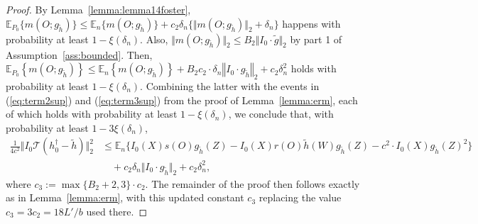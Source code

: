 \documentclass[twoside,11pt]{article}
\newcommand{\E}{\mathbb{E}}
\newcommand{\mc}{\mathcal}
\begin{document}
\begin{proof}
 By Lemma~\ref{lemma:lemma14foster}, $\E_{P_0}\{m(O;g_{\tilde h})\}\le \E_n\{m(O;g_{\tilde h})\}+ c_2\delta_n\{\Vert m(O;g_{\tilde h})\Vert_2+\delta_n\}$
happens with probability at least $1-\xi(\delta_n)$. Also, $\Vert m(O;g_{\tilde h})\Vert_2\le B_2\Vert I_0\cdot\tilde  g\Vert_2$ by part 1 of Assumption~\ref{ass:bounded}. Then, $\E_{P_0}\left\{m(O;g_{\tilde h})\right\}\le \E_n\left\{m(O;g_{\tilde h})\right\}+ B_2c_2\cdot\delta_n\left\Vert I_0\cdot g_{\tilde h}\right\Vert_2+c_2\delta^2_n$ holds with probability at least $1-\xi(\delta_n)$. Combining the latter with the events in (\ref{eq:term2sup}) and (\ref{eq:term3sup}) from the proof of Lemma~\ref{lemma:erm}, each of which holds with probability at least $1-\xi(\delta_n)$, we conclude that, with probability at least $1-3\xi(\delta_n)$,
\begin{align*}
      \frac{1}{4c^2}\big\Vert I_0\mc{T}\left(h_0^\dag-\tilde h\right)\big\Vert^2_2&\le\E_n\big\{I_0(X)s(O)g_{\tilde h}(Z)-I_0(X)r(O)\tilde h(W)g_{\tilde h}(Z)-c^2\cdot I_0(X)g_{\tilde h}(Z)^2\big\}\\
    &\quad +c_2\delta_n\Vert I_0\cdot g_{\tilde h}\Vert_2 +c_2\delta_n^2,
\end{align*}
where $c_3:=\max\{B_2+2,3\}\cdot c_2$. The remainder of the proof then follows exactly as in Lemma~\ref{lemma:erm}, with this updated constant $c_3$ replacing the value $c_3=3c_2=18L'/b$ used there.
\end{proof}
\end{document}
